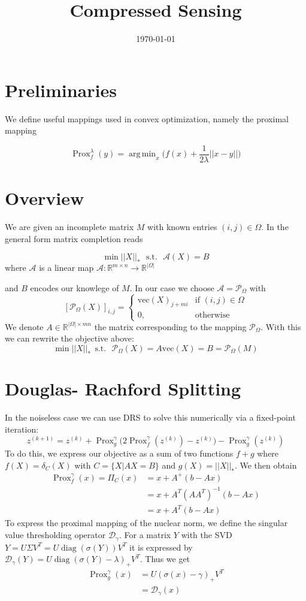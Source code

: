 \documentclass{article}
\title{Compressed Sensing}
\date{\today}
\numberwithin{equation}{section}
\DeclareMathOperator*{\argmin}{arg\,min}
\DeclareMathOperator{\Prox}{Prox}
\DeclareMathOperator{\diag}{diag}
\begin{document}
\maketitle

\section{Preliminaries}

We define useful mappings used in convex optimization, namely the proximal mapping

$$\Prox_f^\lambda(y) = \argmin_x \Big( f(x) + \frac{1}{2 \lambda} || x - y|| \Big)$$

\section{Overview}
We are given an incomplete matrix $M$ with known entries $(i,j) \in \Omega$. In the general form matrix completion reads

$$\min ||X||_* \ \ \ \text{s.t.} \ \ \ \mathcal{A}(X) = B$$
where $\mathcal{A}$ is a linear map $\mathcal{A}:\mathbb{R}^{m \times n} \longrightarrow \mathbb{R}^{|\Omega|}$

and $B$ encodes our knowlege of $M$.
In our case we choose $ \mathcal{A} = \mathcal{P}_\Omega$ with
$$
[\mathcal{P}_\Omega(X)]_{i,j}= 
\begin{cases}
    \text{vec}(X)_{j+mi} & \text{if } (i,j) \in \Omega\\
    0,              & \text{otherwise}
\end{cases}
$$
We denote $A \in \mathbb{R}^{|\Omega| \times mn}$ the matrix corresponding to the mapping $\mathcal{P}_\Omega$. 
With this we can rewrite the objective above:
$$\min ||X||_* \ \ \text{s.t.} \ \ \ \mathcal{P}_\Omega(X) = A\text{vec}(X) = B = \mathcal{P}_\Omega(M)$$
\section{Douglas- Rachford Splitting}
In the noiseless case we can use DRS to solve this numerically via a fixed-point iteration: 
$$z^{(k+1)} = z^{(k)} + \Prox_{g}^\gamma\Big(2 \Prox_{f}^\gamma(z^{(k)}) - z^{(k)}\Big) - \Prox_{g}^\gamma(z^{(k)})$$
To do this, we express our objective as a sum of two functions $f + g$ where $f(X) = \delta_C(X)$ with $C = \lbrace X | AX = B \rbrace$ and $g(X) = ||X||_*$. We then obtain
\begin{align*}
\Prox_{f}^\gamma(x) = \Pi_C(x) &= x + A^+(b-Ax)
\\ &= x + A^T(A A^T)^{-1}(b - Ax)
\\ &= x + A^T(b-Ax)
\end{align*}
To express the proximal mapping of the nuclear norm, we define the singular value thresholding operator $\mathcal{D}_\gamma$. For a matrix $Y$ with the SVD
$Y = U \Sigma V^T = U \diag(\sigma(Y)) V^T$ it is expressed by $\mathcal{D}_\gamma (Y) = U \diag(\sigma(Y) - \lambda)_+ V^T$. Thus we get
\begin{align*}
\Prox_{g}^\gamma(x) &= U (\sigma(x) - \gamma)_{+} V^T
\\ &= \mathcal{D}_\gamma(x)
\end{align*}
\end{document}

